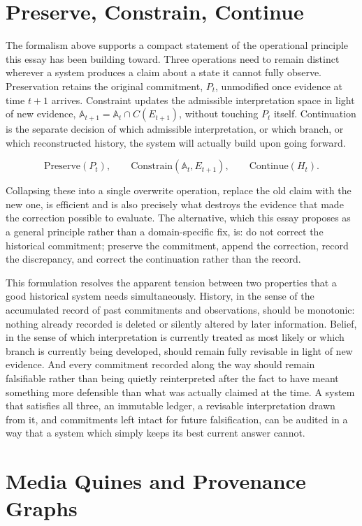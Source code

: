 \documentclass[11pt]{article}
\begin{document}
\section{Preserve, Constrain, Continue}

The formalism above supports a compact statement of the operational principle this essay has been building toward. Three operations need to remain distinct wherever a system produces a claim about a state it cannot fully observe. Preservation retains the original commitment, $P_t$, unmodified once evidence at time $t+1$ arrives. Constraint updates the admissible interpretation space in light of new evidence, $\mathbb{A}_{t+1} = \mathbb{A}_t \cap C(E_{t+1})$, without touching $P_t$ itself. Continuation is the separate decision of which admissible interpretation, or which branch, or which reconstructed history, the system will actually build upon going forward.

\[
\text{Preserve}(P_t), \qquad \text{Constrain}(\mathbb{A}_t, E_{t+1}), \qquad \text{Continue}(H_t).
\]

Collapsing these into a single overwrite operation, replace the old claim with the new one, is efficient and is also precisely what destroys the evidence that made the correction possible to evaluate. The alternative, which this essay proposes as a general principle rather than a domain-specific fix, is: do not correct the historical commitment; preserve the commitment, append the correction, record the discrepancy, and correct the continuation rather than the record.

This formulation resolves the apparent tension between two properties that a good historical system needs simultaneously. History, in the sense of the accumulated record of past commitments and observations, should be monotonic: nothing already recorded is deleted or silently altered by later information. Belief, in the sense of which interpretation is currently treated as most likely or which branch is currently being developed, should remain fully revisable in light of new evidence. And every commitment recorded along the way should remain falsifiable rather than being quietly reinterpreted after the fact to have meant something more defensible than what was actually claimed at the time. A system that satisfies all three, an immutable ledger, a revisable interpretation drawn from it, and commitments left intact for future falsification, can be audited in a way that a system which simply keeps its best current answer cannot.

\section{Media Quines and Provenance Graphs}
\end{document}
